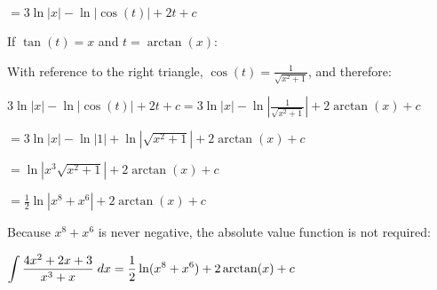 \message{ !name(written11.tex)}\documentclass{article}
\begin{document}
 \begin{center}
  \( \displaystyle = 3\ln|x| - \ln|\cos(t)| + 2t + c\) 
 \end{center}
If $\tan(t) = x$ and $t = \arctan(x):$
\begin{center}
\end{center}
With reference to the right triangle, $\cos(t) = \frac{1}{\sqrt{x^2+1}}$, and therefore:
\begin{center}
  \( \displaystyle 3\ln|x| - \ln|\cos(t)| + 2t + c = 3\ln|x| - \ln|\frac{1}{\sqrt{x^2+1}}| + 2\arctan(x) + c\) 
 \end{center}
 \begin{center}
  \( \displaystyle = 3\ln|x| - \ln|1| + \ln|\sqrt{x^2+1}| + 2\arctan(x) + c\) 
 \end{center}
 \begin{center}
  \( \displaystyle = \ln|x^3\sqrt{x^2+1}| + 2\arctan(x) + c\) 
 \end{center}
 \begin{center}
  \( \displaystyle = \frac{1}{2}\ln|x^8+x^6| + 2\arctan(x) + c\) 
 \end{center}
 Because $x^8 + x^6$ is never negative, the absolute value function is not required:
 \begin{center}
  \( \displaystyle \int \frac{4x^2 + 2x + 3}{x^3 + x} \hspace{0.1cm} dx = \frac{1}{2}\ln({x^8+x^6}) + 2\arctan(x) + c\) 
 \end{center}
\end{document}
